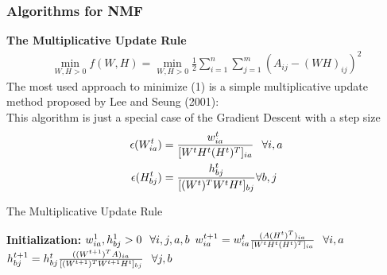 \documentclass[aspectratio=169]{beamer}
\begin{document}

\begin{frame}
    \frametitle{Algorithms for NMF}
    \textbf{The Multiplicative Update Rule}
    \begin{align}
        \min_{W,H>0}f(W,H) = \min_{W,H>0} \frac{1}{2}\sum_{i = 1}^{n}\sum_{j= 1}^{m} (A_{ij} - (WH)_{ij})^{2} \label{op}
    \end{align}
    The most used approach to minimize (1) is a simple multiplicative update method
    proposed by Lee and Seung (2001):\\
    This algorithm is just a special case of the Gradient Descent with a step size 
    \begin{align*}
        \epsilon(W_{ia}^{t}) &= \frac{w^{t}_{ia}}{[W^{t}H^{t}(H^{t})^{T}]_{ia}}\hspace{0.1in} \forall i,a\\
        \epsilon(H_{bj}^{t}) &= \frac{h^{t}_{bj}}{[(W^{t})^{T}W^{t}H^{t}]_{bj}}\forall b,j  
    \end{align*}
\end{frame}
\begin{frame}
    \begin{algorithm}[H]
    \caption{The Multiplicative Update Rule}
     \textbf{Initialization:} $w_{ia}^{1}, h_{bj}^{1} > 0 \hspace{0.1in}\forall i,j,a,b$\;
     {
    $w_{ia}^{t+1} = w_{ia}^{t}\frac{(A(H^{t})^{T})_{ia}}{[W^{t}H^{t}(H^{t})^{T}]_{ia}} \hspace{0.1in}\forall i,a$\;
    $h_{bj}^{t+1} = h_{bj}^{t}\frac{((W^{t+1})^{T}A)_{ia}}{[(W^{t+1})^{T}W^{t+1}H^{t}]_{bj}} \hspace{0.1in}\forall j,b$\;}
    \end{algorithm}  
\end{frame}
\end{document}
